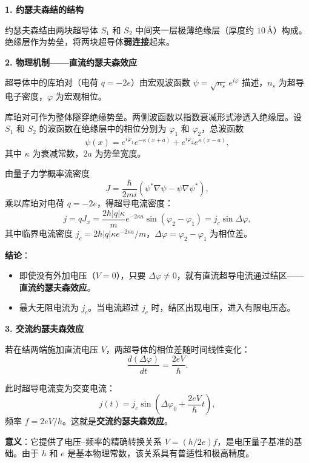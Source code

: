 \begin{derivationbox}[标准解题过程]
\textbf{1. 约瑟夫森结的结构}

约瑟夫森结由两块超导体 $S_1$ 和 $S_2$ 中间夹一层极薄绝缘层（厚度约 $10\,\text{\AA}$）构成。绝缘层作为势垒，将两块超导体\textbf{弱连接}起来。

\textbf{2. 物理机制——直流约瑟夫森效应}

超导体中的库珀对（电荷 $q=-2e$）由宏观波函数 $\psi=\sqrt{n_s}\,e^{i\varphi}$ 描述，$n_s$ 为超导电子密度，$\varphi$ 为宏观相位。

库珀对可作为整体隧穿绝缘势垒。两侧波函数以指数衰减形式渗透入绝缘层。设 $S_1$ 和 $S_2$ 的波函数在绝缘层中的相位分别为 $\varphi_1$ 和 $\varphi_2$，总波函数
\begin{equation}
\psi(x)=e^{i\varphi_1}e^{-\kappa(x+a)}+e^{i\varphi_2}e^{\kappa(x-a)},
\end{equation}
其中 $\kappa$ 为衰减常数，$2a$ 为势垒宽度。

由量子力学概率流密度
\begin{equation}
J=\frac{\hbar}{2mi}(\psi^*\nabla\psi-\psi\nabla\psi^*),
\end{equation}
乘以库珀对电荷 $q=-2e$，得超导电流密度：
\begin{equation}
j=qJ_x=\frac{2\hbar|q|\kappa}{m}e^{-2\kappa a}\sin(\varphi_2-\varphi_1)=j_c\sin\Delta\varphi,
\end{equation}
其中临界电流密度 $j_c=2\hbar|q|\kappa e^{-2\kappa a}/m$，$\Delta\varphi=\varphi_2-\varphi_1$ 为相位差。

\textbf{结论}：
\begin{itemize}
    \item 即使没有外加电压（$V=0$），只要 $\Delta\varphi\neq0$，就有直流超导电流通过结区——\textbf{直流约瑟夫森效应}。
    \item 最大无阻电流为 $j_c$。当电流超过 $j_c$ 时，结区出现电压，进入有限电压态。
\end{itemize}

\textbf{3. 交流约瑟夫森效应}

若在结两端施加直流电压 $V$，两超导体的相位差随时间线性变化：
\begin{equation}
\frac{d(\Delta\varphi)}{dt}=\frac{2eV}{\hbar}.
\end{equation}

此时超导电流变为交变电流：
\begin{equation}
j(t)=j_c\sin\!\left(\Delta\varphi_0+\frac{2eV}{\hbar}t\right),
\end{equation}
频率 $f=2eV/h$。这就是\textbf{交流约瑟夫森效应}。

\textbf{意义}：它提供了电压--频率的精确转换关系 $V=(h/2e)f$，是电压量子基准的基础。由于 $h$ 和 $e$ 是基本物理常数，该关系具有普适性和极高精度。
\end{derivationbox}

